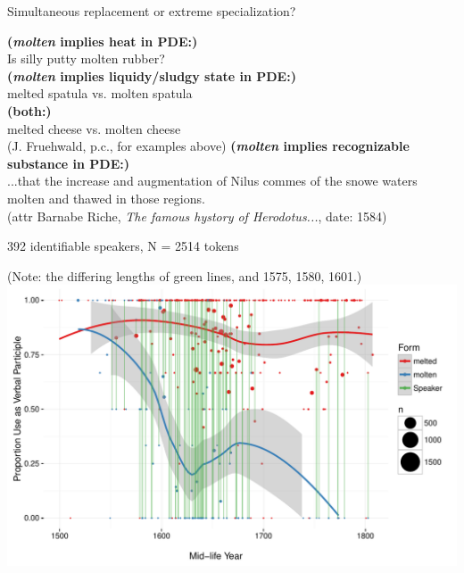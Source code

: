 \documentclass[hyperref={pdfpagelabels=false}]{beamer}
\begin{document}
\begin{frame}{Simultaneous replacement or extreme specialization?}
		\begin{exe}
			\ex \textbf{(\textsl{molten} implies heat in PDE:)}\\
			Is silly putty molten rubber?\\
			\ex \textbf{(\textsl{molten} implies liquidy/sludgy state in PDE:)}\\
			melted spatula vs. molten spatula\\
			\ex \textbf{(both:)}\\
			melted cheese vs. molten cheese\\
			(J. Fruehwald, p.c., for examples above)
			\ex \textbf{(\textsl{molten} implies recognizable substance in PDE:)}\\
			...that the increase and augmentation of Nilus commes of the snowe waters molten and thawed in those regions.\\
			(attr Barnabe Riche, \textsl{The famous hystory of Herodotus...}, date: 1584)
		\end{exe}
		
\end{frame}


\begin{frame}{392 identifiable speakers, N = 2514 tokens}

\begin{center}
\small{(Note: the differing lengths of green lines, and 1575, 1580, 1601.)}
\includegraphics[width=1.128\textwidth]{ContextByDateAuthor.pdf}
\end{center}%
\end{frame}
\end{document}

